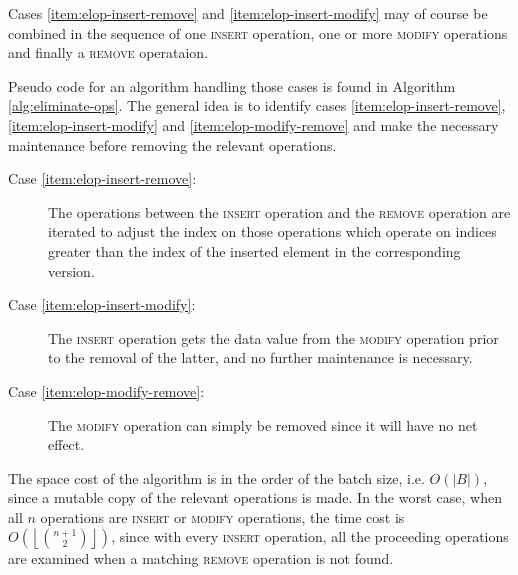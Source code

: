 Cases \ref{item:elop-insert-remove} and \ref{item:elop-insert-modify} may of
course be combined in the sequence of one \textsc{insert} operation, one or more
\textsc{modify} operations and finally a \textsc{remove} operataion.

Pseudo code for an algorithm handling those cases is found in Algorithm
\ref{alg:eliminate-ops}.
The general idea is to identify cases \ref{item:elop-insert-remove},
\ref{item:elop-insert-modify} and \ref{item:elop-modify-remove} and make the
necessary maintenance before removing the relevant operations.

\begin{description}
  \item [Case \ref{item:elop-insert-remove}:] The operations between the
  \textsc{insert} operation and the \textsc{remove} operation are iterated to
  adjust the index on those operations which operate on indices greater than the
  index of the inserted element in the corresponding version.
  
  \item [Case \ref{item:elop-insert-modify}:] The \textsc{insert} operation gets
  the data value from the \textsc{modify} operation prior to the removal of the
  latter, and no further maintenance is necessary.
  
  \item [Case \ref{item:elop-modify-remove}:] The \textsc{modify} operation can
  simply be removed since it will have no net effect.

\end{description}

The space cost of the algorithm is in the order of the batch size, i.e.
$O(\left|B\right|)$, since a mutable copy of the relevant operations is made.
In the worst case, when all $n$ operations are \textsc{insert} or
\textsc{modify} operations, the time cost is
$O\left(\left\lfloor\binom{n+1}{2}\right\rfloor\right)$, since with every
\textsc{insert} operation, all the proceeding operations are examined when a
matching \textsc{remove} operation is not found.

